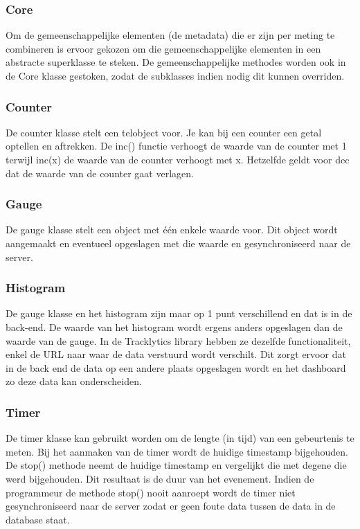 \subsubsection{Core}
Om de gemeenschappelijke elementen (de metadata) die er zijn per meting te combineren is ervoor gekozen om die gemeenschappelijke elementen in een abstracte superklasse te steken. De gemeenschappelijke methodes worden ook in de Core klasse gestoken, zodat de subklasses indien nodig dit kunnen overriden. 

\subsubsection{Counter}
De counter klasse stelt een telobject voor. Je kan bij een counter een getal optellen en aftrekken. De inc() functie verhoogt de waarde van de counter met 1 terwijl inc(x) de waarde van de counter verhoogt met x. Hetzelfde geldt voor dec dat de waarde van de counter gaat verlagen. 

\subsubsection{Gauge}
De gauge klasse stelt een object met \'e\'en enkele waarde voor. Dit object wordt aangemaakt en eventueel opgeslagen met die waarde en gesynchroniseerd naar de server. 

\subsubsection{Histogram}
De gauge klasse en het histogram zijn maar op 1 punt verschillend en dat is in de back-end. De waarde van het histogram wordt ergens anders opgeslagen dan de waarde van de gauge. In de Tracklytics library hebben ze dezelfde functionaliteit, enkel de URL naar waar de data verstuurd wordt verschilt. Dit zorgt ervoor dat in de back end de data op een andere plaats opgeslagen wordt en het dashboard zo deze data kan onderscheiden.

\subsubsection{Timer}
De timer klasse kan gebruikt worden om de lengte (in tijd) van een gebeurtenis te meten. Bij het aanmaken van de timer wordt de huidige timestamp bijgehouden. De stop() methode neemt de huidige timestamp en vergelijkt die met degene die werd bijgehouden. Dit resultaat is de duur van het evenement. Indien de programmeur de methode stop() nooit aanroept wordt de timer niet gesynchroniseerd naar de server zodat er geen foute data tussen de data in de database staat. 

